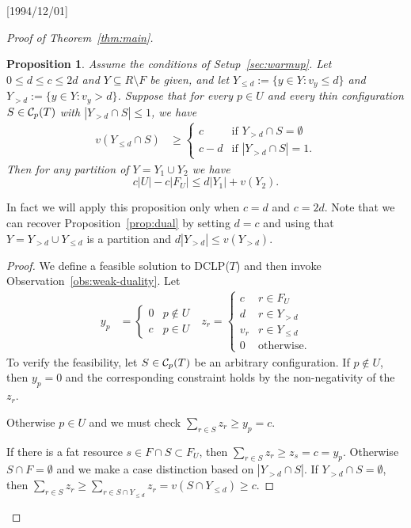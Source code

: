 \NeedsTeXFormat{LaTeX2e}[1994/12/01]\documentclass[letterpaper, 11pt]{article}
\newtheorem{prop}[thm]{Proposition}
\theoremstyle{definition}
\theoremstyle{remark}
\numberwithin{equation}{section}
\begin{document}
\begin{proof}[Proof of Theorem~\ref{thm:main}]
\begin{prop}\label{prop:refined-dual}
Assume the conditions of Setup~\ref{sec:warmup}. Let 
$0\leq d\leq c\leq 2d$ and  
$Y\subseteq R\setminus F$ be given, and let $Y_{\leq d} := \{ y\in Y :
  v_y \leq d \}$ and $Y_{> d} := \{ y\in Y : v_y > d \}$. Suppose that
  for every $p\in U$ and every thin configuration $S \in {\cal
    C}_p(T)$ with  
$|Y_{> d}\cap S| \leq 1$, we have
\begin{align*}
v(Y_{\leq d}\cap S) & \geq \left\{ 
\begin{array}{ll}
c       & \mbox{if $Y_{>d} \cap S = \emptyset$} \\
   c-d & \mbox{if  $|Y_{>d}\cap S| = 1$.}
 \end{array}
\right.
\end{align*}
Then 
for any partition of $Y = Y_1 \cup Y_2$ we have
$$ c|U| - c|F_U| \leq d|Y_1| + v(Y_2).$$
\end{prop}
 In fact we will apply this proposition only when $c=d$ and $c=2d$.
Note that we can recover Proposition~\ref{prop:dual}
by setting $d=c$ and using that $Y=Y_{>d} \cup Y_{\leq d}$ is a partition and $d|Y_{>d}| \leq v(Y_{>d})$. 

\begin{proof}
We define a feasible  solution to DCLP($T$) and then invoke Observation~\ref{obs:weak-duality}. Let
\begin{align*} 
y_p & = \left\{ 
\begin{array}{ll} 
0 & p\not\in U \\
c& p\in U 
\end{array}
\right.
\ \ \ 
z_r = \left\{
\begin{array}{cc}
  c & r\in F_U \\
 d & r\in Y_{> d}\\
 v_r & r\in Y_{\leq d} \\
0 & \mbox{otherwise.}
\end{array}
\right.
\end{align*}
To verify the feasibility, let $S\in {\cal C}_p(T)$ be an arbitrary configuration.
If $p\not\in U$, then $y_p=0$ and the corresponding constraint holds
by the non-negativity of the $z_r$. 

Otherwise $p\in U$ and we must check $\sum_{r\in S} z_r \geq y_p = c$. 

If there is a fat resource $s\in F\cap S \subset F_U$, then 
$\sum_{r\in S}z_r \geq z_s = c =y_p$.  
Otherwise $S\cap F = \emptyset$ and we make a case distinction based
on $|Y_{>d}\cap S|$. 
If $Y_{>d}\cap S = \emptyset$, then $\sum_{r\in
  S}z_r \geq \sum_{r\in S\cap Y_{\leq d}}z_r = v(S \cap Y_{\leq d})
\geq c$.


\end{proof}
\end{proof}
\end{document}
